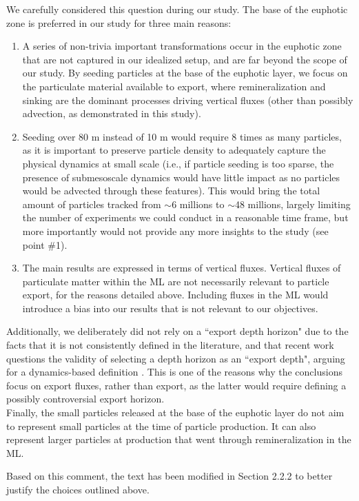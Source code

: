 \documentclass[12pt,letter]{article}
\begin{document}
{\color{blue}
We carefully considered this question during our study. The base of the euphotic zone is preferred in our study for three main reasons: 
			\begin{enumerate}
				\item A series of non-trivia important transformations occur in the euphotic zone \citep[e.g., grazing, material packaging, and many others; see][for example]{Denman_1999} that are not captured in our idealized setup, and are far beyond the scope of our study. By seeding particles at the base of the euphotic layer, we focus on the particulate material available to export, where remineralization and sinking are the dominant processes driving vertical fluxes (other than possibly advection, as demonstrated in this study).
				\item Seeding over 80 m instead of 10 m would require 8 times as many particles, as it is important to preserve particle density to adequately capture the physical dynamics at small scale (i.e., if particle seeding is too sparse, the presence of submesoscale dynamics would have little impact as no particles would be advected through these features). This would bring the total amount of particles tracked from $\sim$6 millions to $\sim$48 millions, largely limiting the number of experiments we could conduct in a reasonable time frame, but more importantly would not provide any more insights to the study (see point \#1).
				\item The main results are expressed in terms of vertical fluxes. Vertical fluxes of particulate matter within the ML are not necessarily relevant to particle export, for the reasons detailed above. Including fluxes in the ML would introduce a bias into our results that is not relevant to our objectives.
			\end{enumerate}

Additionally, we deliberately did not rely on a ``export depth horizon" due to the facts that it is not consistently defined in the literature, and that recent work questions the validity of selecting a depth horizon as an ``export depth", arguing for a dynamics-based definition \citep{Palevsky_2018}. This is one of the reasons why the conclusions focus on export fluxes, rather than export, as the latter would require defining a possibly controversial export horizon.\\

Finally, the small particles released at the base of the euphotic layer do not aim to represent small particles at the time of particle production. It can also represent larger particles at production that went through remineralization in the ML.

Based on this comment, the text has been modified in Section 2.2.2 to better justify the choices outlined above.\\}
\end{document}
